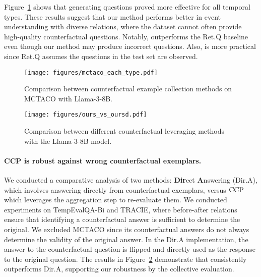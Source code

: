 Figure~\ref{fig:mctaco_each_type} shows that generating \contrast questions proved more effective for all temporal types.
These results suggest that our method performs better in event understanding with diverse relations, where the dataset cannot often provide high-quality counterfactual questions. Notably, \ours outperforms the Ret.Q baseline even though our method may produce incorrect questions. Also, \ours is more practical since Ret.Q assumes the questions in the test set are observed.

\begin{figure}[h]
    \centering
    \texttt{[image: figures/mctaco\_each\_type.pdf]}
    \vspace{-8mm}
    \caption{Comparison between counterfactual example collection methods on MCTACO with Llama-3-8B.}
    \vspace{-5mm}
    \label{fig:mctaco_each_type}
\end{figure}

\begin{figure}[h]
    \centering
    \texttt{[image: figures/ours\_vs\_oursd.pdf]}
    \vspace{-8mm}
    \caption{Comparison between different counterfactual leveraging methods with the Llama-3-8B model.}
    \vspace{-5mm}
    \label{fig:ours_vs_oursd}
\end{figure}

\paragraph{CCP is robust against wrong counterfactual exemplars.}
We conducted a comparative analysis of two methods: \textbf{Dir}ect \textbf{A}nswering (Dir.A), which involves answering directly from counterfactual exemplars, versus $\text{CCP}$ which leverages the aggregation step to re-evaluate them. 
We conducted experiments on TempEvalQA-Bi and TRACIE, where before-after relations ensure that identifying a counterfactual answer is sufficient to determine the original. We excluded MCTACO since its counterfactual answers do not always determine the validity of the original answer. In the $\text{Dir.A}$ implementation, the answer to the counterfactual question is flipped and directly used as the response to the original question.
The results in Figure~\ref{fig:ours_vs_oursd} demonstrate that \ours consistently outperforms $\text{Dir.A}$, supporting our robustness by the collective evaluation.



